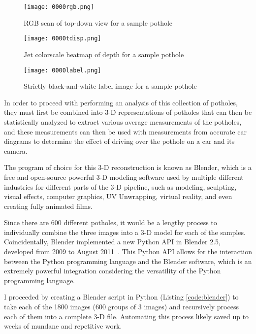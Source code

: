 \documentclass{article}
\begin{document}
\begin{figure}[!htb]
        \texttt{[image: 0000rgb.png]}
        \caption{RGB scan of top-down view for a sample pothole}\label{fig:potholeimagergb}
    \endminipage\hfill
        \texttt{[image: 0000tdisp.png]}
        \caption{Jet colorscale heatmap of depth for a sample pothole}\label{fig:potholeimagetdisp}
    \endminipage\hfill
        \texttt{[image: 0000label.png]}
        \caption{Strictly black-and-white label image for a sample pothole}\label{fig:potholeimagelabel}
    \endminipage
\end{figure}


In order to proceed with performing an analysis of this collection of potholes, they must first be combined into 3-D representations of potholes that can then be statistically analyzed to extract various average measurements of the potholes, and these measurements can then be used with measurements from accurate car diagrams to determine the effect of driving over the pothole on a car and its camera.

The program of choice for this 3-D reconstruction is known as Blender, which is a free and open-source powerful 3-D modeling software used by multiple different industries for different parts of the 3-D pipeline, such as modeling, sculpting, visual effects, computer graphics, UV Unwrapping, virtual reality, and even creating fully animated films. 


Since there are 600 different potholes, it would be a lengthy process to individually combine the three images into a 3-D model for each of the samples. Coincidentally, Blender implemented a new Python API in Blender 2.5, developed from 2009 to August 2011~\cite{blendermanual_2022}. This Python API allows for the interaction between the Python programming language and the Blender software, which is an extremely powerful integration considering the versatility of the Python programming language. 

I proceeded by creating a Blender script in Python (Listing \ref{code:blender}) to take each of the 1800 images (600 groups of 3 images) and recursively process each of them into a complete 3-D file. Automating this process likely saved up to weeks of mundane and repetitive work.
\end{document}
